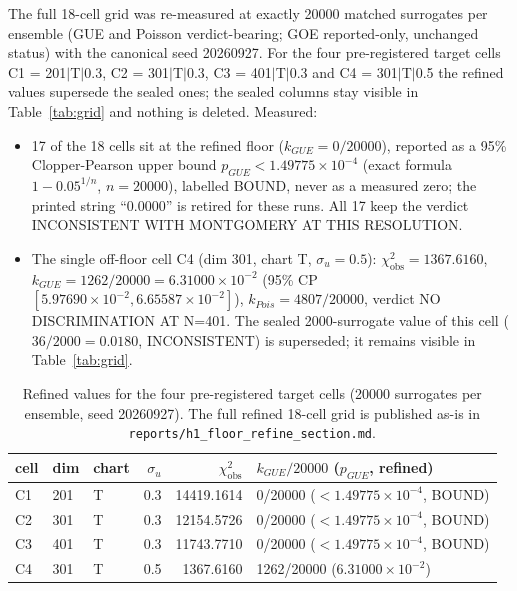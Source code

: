 \documentclass[11pt]{article}
\begin{document}
The full 18-cell grid was re-measured at exactly 20000 matched surrogates
per ensemble (GUE and Poisson verdict-bearing; GOE reported-only,
unchanged status) with the canonical seed 20260927. For the four
pre-registered target cells C1 = 201$|$T$|$0.3, C2 = 301$|$T$|$0.3,
C3 = 401$|$T$|$0.3 and C4 = 301$|$T$|$0.5 the refined values supersede
the sealed ones; the sealed columns stay visible in Table~\ref{tab:grid}
and nothing is deleted. Measured:

\begin{itemize}
\item 17 of the 18 cells sit at the refined floor ($k_{GUE} = 0/20000$),
reported as a 95\% Clopper-Pearson upper bound
$p_{GUE} < 1.49775 \times 10^{-4}$ (exact formula $1 - 0.05^{1/n}$,
$n = 20000$), labelled BOUND, never as a measured zero; the printed
string ``0.0000'' is retired for these runs. All 17 keep the verdict
INCONSISTENT WITH MONTGOMERY AT THIS RESOLUTION.
\item The single off-floor cell C4 (dim 301, chart T, $\sigma_u = 0.5$):
$\chi^2_{\mathrm{obs}} = 1367.6160$, $k_{GUE} = 1262/20000 = 6.31000
\times 10^{-2}$ (95\% CP $[5.97690 \times 10^{-2}, 6.65587 \times
10^{-2}]$), $k_{Pois} = 4807/20000$, verdict NO DISCRIMINATION AT N=401.
The sealed 2000-surrogate value of this cell ($36/2000 = 0.0180$,
INCONSISTENT) is superseded; it remains visible in Table~\ref{tab:grid}.
\end{itemize}

\begin{table}[htbp]\centering\small
\begin{tabular}{@{}l l l r r l@{}}
\toprule
cell & dim & chart & $\sigma_u$ & $\chi^2_{\mathrm{obs}}$ & $k_{GUE}/20000$ ($p_{GUE}$, refined) \\
\midrule
C1 & 201 & T & 0.3 & 14419.1614 & 0/20000 ($< 1.49775\times 10^{-4}$, BOUND) \\
C2 & 301 & T & 0.3 & 12154.5726 & 0/20000 ($< 1.49775\times 10^{-4}$, BOUND) \\
C3 & 401 & T & 0.3 & 11743.7710 & 0/20000 ($< 1.49775\times 10^{-4}$, BOUND) \\
C4 & 301 & T & 0.5 & 1367.6160 & 1262/20000 ($6.31000\times 10^{-2}$) \\
\bottomrule
\end{tabular}
\caption{Refined values for the four pre-registered target cells
(20000 surrogates per ensemble, seed 20260927). The full refined
18-cell grid is published as-is in
\texttt{reports/h1\_floor\_refine\_section.md}.}
\label{tab:refined}
\end{table}
\end{document}
